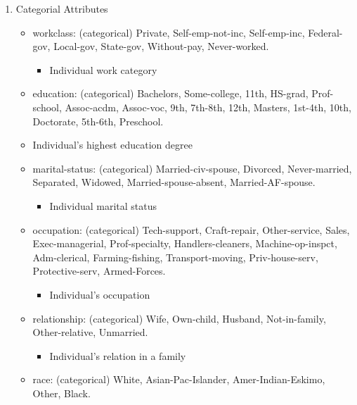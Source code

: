 \documentclass[11pt]{article}
\providecommand{\tightlist}{%
      \setlength{\itemsep}{0pt}\setlength{\parskip}{0pt}}
\begin{document}
\begin{enumerate}
\def\labelenumi{\arabic{enumi}.}
\tightlist
\item
  Categorial Attributes

  \begin{itemize}
  \tightlist
  \item
    workclass: (categorical) Private, Self-emp-not-inc, Self-emp-inc,
    Federal-gov, Local-gov, State-gov, Without-pay, Never-worked.

    \begin{itemize}
    \tightlist
    \item
      Individual work category
    \end{itemize}
  \item
    education: (categorical) Bachelors, Some-college, 11th, HS-grad,
    Prof-school, Assoc-acdm, Assoc-voc, 9th, 7th-8th, 12th, Masters,
    1st-4th, 10th, Doctorate, 5th-6th, Preschool.
  \item
    Individual's highest education degree
  \item
    marital-status: (categorical) Married-civ-spouse, Divorced,
    Never-married, Separated, Widowed, Married-spouse-absent,
    Married-AF-spouse.

    \begin{itemize}
    \tightlist
    \item
      Individual marital status
    \end{itemize}
  \item
    occupation: (categorical) Tech-support, Craft-repair, Other-service,
    Sales, Exec-managerial, Prof-specialty, Handlers-cleaners,
    Machine-op-inspct, Adm-clerical, Farming-fishing, Transport-moving,
    Priv-house-serv, Protective-serv, Armed-Forces.

    \begin{itemize}
    \tightlist
    \item
      Individual's occupation
    \end{itemize}
  \item
    relationship: (categorical) Wife, Own-child, Husband, Not-in-family,
    Other-relative, Unmarried.

    \begin{itemize}
    \tightlist
    \item
      Individual's relation in a family
    \end{itemize}
  \item
    race: (categorical) White, Asian-Pac-Islander, Amer-Indian-Eskimo,
    Other, Black.


\end{itemize}
\end{enumerate}
\end{document}
